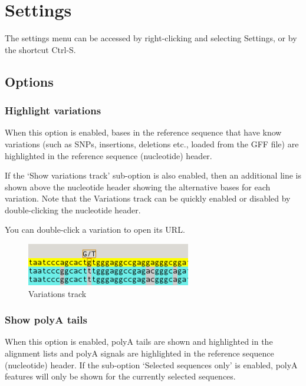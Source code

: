 \documentclass[letterpaper]{article}
\begin{document}
\bigskip

{\color[rgb]{0.0,0.27058825,0.5254902}\section[Settings]{Settings}}
\hypertarget{RefHeading2221056909880}{}
The settings menu can be accessed by right-clicking and selecting Settings, or by the shortcut Ctrl-S.

{\color[rgb]{0.30980393,0.5058824,0.7411765}\subsection[Features]{Options}}
\hypertarget{RefHeading2241056909880}{}
{\color[rgb]{0.30980393,0.5058824,0.7411765}\subsubsection[Highlight variations]{Highlight variations}}
\hypertarget{RefHeading2261056909880}{}
When this option is enabled, bases in the reference sequence that have know variations (such as SNPs, insertions, deletions etc., loaded from the GFF file) are highlighted in the reference sequence (nucleotide) header.

\bigskip

If the {\textquoteleft}Show variations track{\textquoteright} sub-option is also enabled, then an additional line is shown above the nucleotide header showing the alternative bases for each variation. Note that the Variations track can be quickly enabled or disabled by double-clicking the nucleotide header.

\bigskip

You can double-click a variation to open its URL.

\begin{figure}
\centering
\color[rgb]{0.30980393,0.5058824,0.7411765}
\includegraphics[width=7.181cm,height=1.852cm]{img_view_variations.png}
\caption{Variations track}
\end{figure}

\bigskip

{\color[rgb]{0.30980393,0.5058824,0.7411765}\subsubsection[Show polyA tails]{Show polyA tails}}
\hypertarget{RefHeading2281056909880}{}
When this option is enabled, polyA tails are shown and highlighted in the alignment lists and polyA signals are highlighted in the reference sequence (nucleotide) header. If the sub-option {\textquoteleft}Selected sequences only{\textquoteright} is enabled, polyA features will only be shown for the currently selected sequences.
\end{document}
